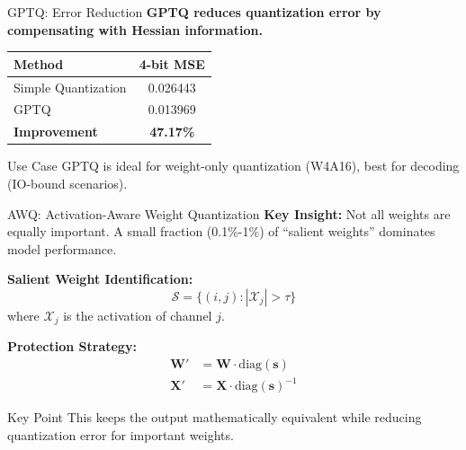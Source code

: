\documentclass[aspectratio=169,10pt]{beamer}
\begin{document}
\begin{frame}{GPTQ: Error Reduction}
    \textbf{GPTQ reduces quantization error by compensating with Hessian information.}

    \vspace{0.3cm}
    \begin{table}
        \centering
        \small
        \begin{tabular}{lc}
            \toprule
            \textbf{Method} & \textbf{4-bit MSE} \\
            \midrule
            Simple Quantization & 0.026443 \\
            GPTQ & 0.013969 \\
            \midrule
            \textbf{Improvement} & \textbf{47.17\%} \\
            \bottomrule
        \end{tabular}
    \end{table}



    \vspace{0.3cm}
    \begin{block}{Use Case}
        GPTQ is ideal for weight-only quantization (W4A16), best for decoding (IO-bound scenarios).
    \end{block}
\end{frame}

\begin{frame}{AWQ: Activation-Aware Weight Quantization}
    \textbf{Key Insight:} Not all weights are equally important. A small fraction (0.1\%-1\%) of ``salient weights'' dominates model performance.

    \vspace{0.3cm}
    \textbf{Salient Weight Identification:}
    $$\mathcal{S} = \{(i, j) : |\mathcal{X}_j| > \tau\}$$
    where $\mathcal{X}_j$ is the activation of channel $j$.

    \vspace{0.3cm}
    \textbf{Protection Strategy:}
    \begin{align*}
        \mathbf{W}' &= \mathbf{W} \cdot \text{diag}(\mathbf{s}) \\
        \mathbf{X}' &= \mathbf{X} \cdot \text{diag}(\mathbf{s})^{-1}
    \end{align*}

    \vspace{0.3cm}
    \begin{block}{Key Point}
        This keeps the output mathematically equivalent while reducing quantization error for important weights.
    \end{block}
\end{frame}
\end{document}
